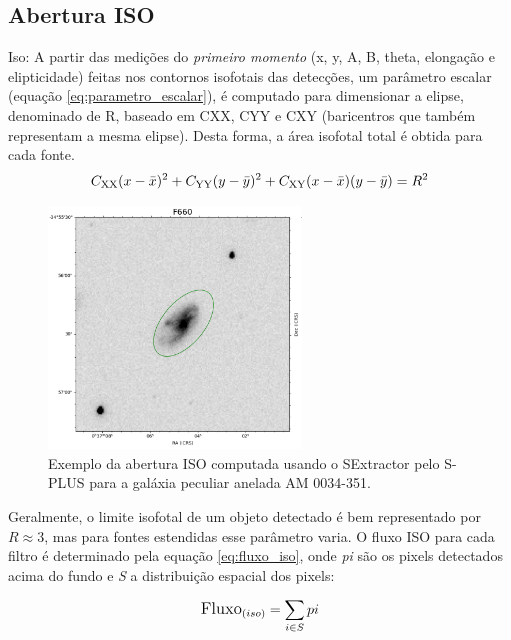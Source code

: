 \subsection{Abertura ISO}
Iso: A partir das medições do \emph{primeiro momento} (x, y, A, B, theta, elongação e elipticidade) feitas nos contornos isofotais das detecções, um parâmetro escalar (equação \ref{eq:parametro_escalar}), é computado para dimensionar a elipse, denominado de R, baseado em CXX, CYY e CXY (baricentros que também representam a mesma elipse). Desta forma, a área isofotal total é obtida para cada fonte.
\newcommand{\CXX}{C_{\text{XX}}}
\newcommand{\CYY}{C_{\text{YY}}}
\newcommand{\CXY}{C_{\text{XY}}}
\begin{equation} \label{eq:parametro_escalar}
\large
\CXX(x-\bar{x})^2 + \CYY(y-\bar{y})^2 + \CXY(x-\bar{x})(y-\bar{y}) = R^2
\end{equation}

\begin{figure}[!h]
  \centering 
  \includegraphics[width=0.6\textwidth]{Imagens/iso_exemplo.png} 
  \caption[Exemplo da abertura ISO para a galáxia AM 0034-351.]{Exemplo da abertura ISO computada usando o SExtractor pelo S-PLUS para a galáxia peculiar anelada AM 0034-351.}
  \label{fig:iso_exemplo} 
\end{figure}

Geralmente, o limite isofotal de um objeto detectado é bem representado por $R \approx 3$, mas para fontes estendidas esse parâmetro varia. O fluxo ISO para cada filtro é determinado pela equação \ref{eq:fluxo_iso}, onde \emph{pi} são os pixels detectados acima do fundo e \emph{S} a distribuição espacial dos pixels:

\begin{equation} \label{eq:fluxo_iso}
\large
\text{Fluxo}_{(iso)} = \sum_{i \in S} pi
\end{equation}

